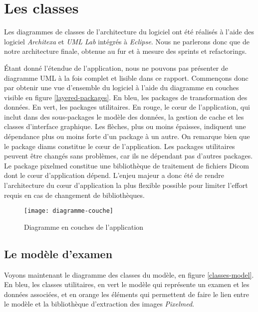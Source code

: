 \section{Les classes}

Les diagrammes de classes de l'architecture du logiciel ont été réalisés à l'aide des logiciel \emph{Architexa} et \emph{UML Lab} intégrés à \emph{Eclipse}. Nous ne parlerons donc que de notre architecture finale, obtenue au fur et à mesure des sprints et refactorings.

Étant donné l'étendue de l'application, nous ne pouvons pas présenter de diagramme UML à la fois complet et lisible dans ce rapport. Commençons donc par obtenir une vue d'ensemble du logiciel à l'aide du diagramme en couches visible en figure \vref{layered-packages}. En bleu, les packages de transformation des données. En vert, les packages utilitaires. En rouge, le cœur de l'application, qui inclut dans des sous-packages le modèle des données, la gestion de cache et les classes d'interface graphique. Les flèches, plus ou moins épaisses, indiquent une dépendance plus ou moins forte d'un package à un autre.
On remarque bien que le package diams constitue le cœur de l'application.
Les packages utilitaires peuvent être changés sans problèmes, car ils ne dépendant pas d'autres packages.
Le package pixelmed constitue une bibliothèque de traitement de fichiers Dicom dont le cœur d'application dépend.
L'enjeu majeur a donc été de rendre l'architecture du cœur d'application la plus flexible possible pour limiter
l'effort requis en cas de changement de bibliothèques.


\begin{figure}[h]
\begin{center}
    \texttt{[image: diagramme-couche]}
\end{center}
    \caption{Diagramme en couches de l'application}
    \label{layered-packages}
\end{figure}

\subsection{Le modèle d'examen}

Voyons maintenant le diagramme des classes du modèle, en figure \vref{classes-model}.
En bleu, les classes utilitaires, en vert le modèle qui représente un examen et les données associées, et en
orange les éléments qui permettent de faire le lien entre le modèle et la bibliothèque d'extraction des images \emph{Pixelmed}.

